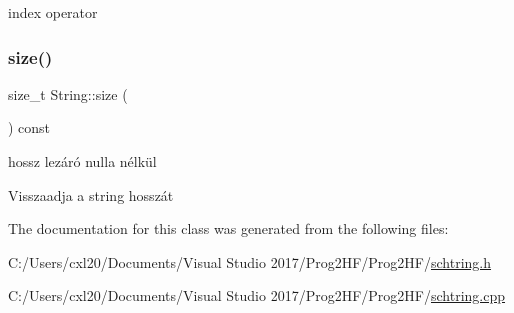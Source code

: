 index operator 

\mbox{\label{class_string_a588c5cc9faededbb9d938662d354feed}} 
\subsubsection{\texorpdfstring{size()}{size()}}
{\footnotesize\ttfamily size\+\_\+t String\+::size (\begin{DoxyParamCaption}{ }\end{DoxyParamCaption}) const\hspace{0.3cm}{\ttfamily [inline]}}



hossz lezáró nulla nélkül 

Visszaadja a string hosszát 

The documentation for this class was generated from the following files\+:\begin{DoxyCompactItemize}
\item 
C\+:/\+Users/cxl20/\+Documents/\+Visual Studio 2017/\+Prog2\+H\+F/\+Prog2\+H\+F/\mbox{\hyperlink{schtring_8h}{schtring.\+h}}\item 
C\+:/\+Users/cxl20/\+Documents/\+Visual Studio 2017/\+Prog2\+H\+F/\+Prog2\+H\+F/\mbox{\hyperlink{schtring_8cpp}{schtring.\+cpp}}\end{DoxyCompactItemize}
